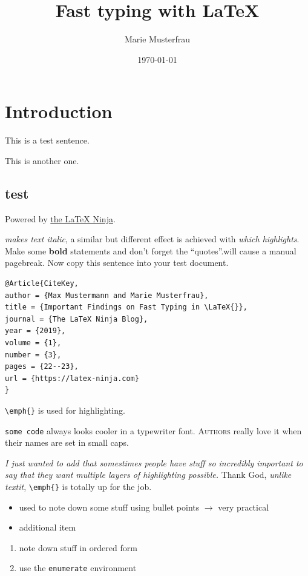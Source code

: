 \documentclass{article}
\title{Fast typing with LaTeX}
\author{Marie Musterfrau}
\date{\today}
\begin{document}
\maketitle
\tableofcontents

\section{Introduction}
This is a test sentence.

This is another one.

\subsection{test}
Powered by \href{http://latex-ninja.com}{the \LaTeX{} Ninja}.

\textit{makes text italic}, a similar but different effect is achieved with \emph{which highlights}. Make some \textbf{bold} statements and don't forget the ``quotes''.\newpage will cause a manual pagebreak. Now copy this sentence into your test document.

\begin{verbatim}
@Article{CiteKey,
author = {Max Mustermann and Marie Musterfrau},
title = {Important Findings on Fast Typing in \LaTeX{}},
journal = {The LaTeX Ninja Blog},
year = {2019},
volume = {1},
number = {3},
pages = {22--23},
url = {https://latex-ninja.com}
}
\end{verbatim}

\verb|\emph{}| is used for highlighting.

\texttt{some code} always looks cooler in a typewriter font.
\textsc{Authors} really love it when their names are set in small caps.


\emph{I just wanted to add that somestimes people have stuff \emph{so incredibly important} to say that they want multiple layers of highlighting possible.} Thank God, \textit{unlike textit}, \verb|\emph{}| is totally up for the job.

\begin{itemize}
    \item used to note down some stuff using bullet points $\to$ very practical
    \item additional item
\end{itemize}


\begin{enumerate}
    \item note down stuff in ordered form
    \item use the \verb|enumerate| environment
\end{enumerate}
\end{document}

